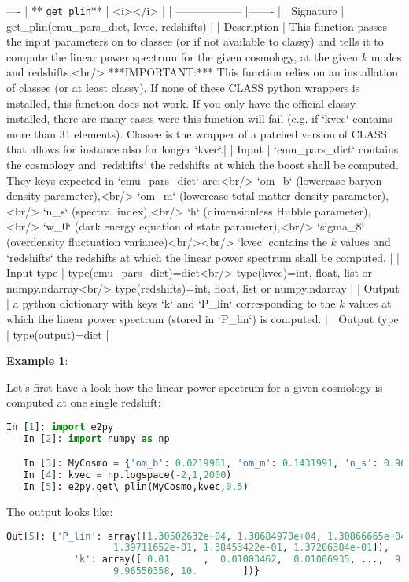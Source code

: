 \documentclass[american,11pt]{article}
\def\code#1{\texttt{#1}}
\begin{document}
----
| ** \code{get\_plin}** | <i></i> |
| ------------------ |-------  |
| Signature | get\_plin(emu\_pars\_dict, kvec, redshifts) |
| Description | This function passes the input parameters on to classee (or if not available to classy) and tells it to compute the linear power spectrum for the given cosmology, at the given $k$ modes and redshifts.<br/> ***IMPORTANT:*** This function relies on an installation of classee (or at least classy). If none of these CLASS python wrappers is installed, this function does not work. If you only have the official classy installed, there are many cases were this function will fail (e.g. if `kvec` contains more than 31 elements). Classee is the wrapper of a patched version of CLASS that allows for instance also for longer `kvec`.|
| Input | `emu\_pars\_dict` contains the cosmology and `redshifts` the redshifts at which the boost shall be computed. They keys expected in `emu\_pars\_dict` are:<br/> `om\_b` (lowercase baryon density parameter),<br/> `om\_m` (lowercase total matter density parameter),<br/> `n\_s` (spectral index),<br/> `h` (dimensionless Hubble parameter),<br/> `w\_0` (dark energy equation of state parameter),<br/> `sigma\_8` (overdensity fluctuation variance)<br/><br/> `kvec` contains the $k$ values and `redshifts` the redshifts at which the linear power spectrum shall be computed. |
| Input type | type(emu\_pars\_dict)=dict<br/> type(kvec)=int, float, list or numpy.ndarray<br/> type(redshifts)=int, float, list or numpy.ndarray |
| Output | a python dictionary with keys `k` and `P\_lin` corresponding to the $k$ values at which the linear power spectrum (stored in `P\_lin`) is computed. |
| Output type | type(output)=dict |

\textbf{Example 1}:

Let's first have a look how the linear power spectrum for a given cosmology is computed at one single redshift:
\begin{lstlisting}[language=python]
   In [1]: import e2py
   In [2]: import numpy as np

   In [3]: MyCosmo = {'om_b': 0.0219961, 'om_m': 0.1431991, 'n_s': 0.96, 'h': 0.67, 'w_0': -1.0, 'sigma_8': 0.83}
   In [4]: kvec = np.logspace(-2,1,2000)
   In [5]: e2py.get\_plin(MyCosmo,kvec,0.5)
\end{lstlisting}
The output looks like:
\begin{lstlisting}[language=python]
   Out[5]: {'P_lin': array([1.30502632e+04, 1.30684970e+04, 1.30866665e+04, ...,
                   1.39711652e-01, 1.38453422e-01, 1.37206384e-01]),
            'k': array([ 0.01      ,  0.01003462,  0.01006935, ...,  9.93112617,
                   9.96550358, 10.        ])}
\end{lstlisting}
\end{document}
